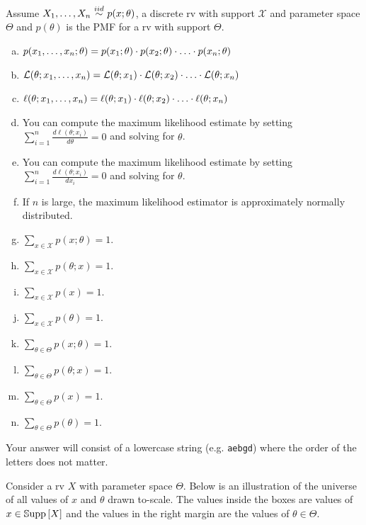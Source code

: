 \documentclass[12pt,landscape]{article}
\newcommand{\instr}{\small Your answer will consist of a lowercase string (e.g. \texttt{aebgd}) where the order of the letters does not matter. \normalsize}
\begin{document}
\problem{} Assume $\Xoneton \iid p(x; \theta)$, a discrete rv with support $\mathcal{X}$ and parameter space $\Theta$ and $p(\theta)$ is the PMF for a rv with support $\Theta$.

\vspace{-0.2cm}\benum{} 

\begin{enumerate}[(a)]
\item $p(x_1, \ldots, x_n; \theta) = p(x_1; \theta)\cdot p(x_2; \theta) \cdot \ldots \cdot p(x_n; \theta)$
\item $\mathcal{L}(\theta; x_1, \ldots, x_n) = \mathcal{L}(\theta; x_1) \cdot \mathcal{L}(\theta; x_2) \cdot \ldots \cdot \mathcal{L}(\theta; x_n)$
\item $\ell(\theta; x_1, \ldots, x_n) = \ell(\theta; x_1) \cdot \ell(\theta; x_2) \cdot \ldots \cdot \ell(\theta; x_n)$\item You can compute the maximum likelihood estimate by setting $\sum_{i=1}^n \displaystyle \frac{d\ell(\theta;x_i) }{d\theta} = 0$ and solving for $\theta$.
\item You can compute the maximum likelihood estimate by setting $\sum_{i=1}^n \displaystyle \frac{d\ell(\theta;x_i) }{dx_i} = 0$ and solving for $\theta$.
\item If $n$ is large, the maximum likelihood estimator is approximately normally distributed.
\item $\sum_{x \in \mathcal{X}} p(x; \theta) = 1$.
\item $\sum_{x \in \mathcal{X}} p(\theta; x) = 1$.
\item $\sum_{x \in \mathcal{X}} p(x) = 1$.
\item $\sum_{x \in \mathcal{X}} p(\theta) = 1$.
\item $\sum_{\theta \in \Theta} p(x; \theta) = 1$.
\item $\sum_{\theta \in \Theta} p(\theta; x) = 1$.
\item $\sum_{\theta \in \Theta} p(x) = 1$.
\item $\sum_{\theta \in \Theta} p(\theta) = 1$.
\end{enumerate}
\eenum\instr\pagebreak


\problem{} Consider a rv $X$ with parameter space $\Theta$. Below is an illustration of the universe of all values of $x$ and $\theta$ drawn to-scale. The values inside the boxes are values of $x \in \mathbb{S}\text{upp}\left[X\right]$ and the values in the right margin are the values of $\theta \in \Theta$.
\end{document}

